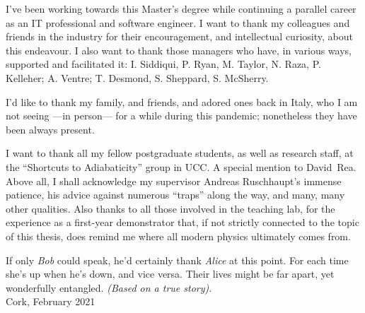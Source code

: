 I've been working towards this Master's degree
while continuing a parallel career
as an IT professional and software engineer.
I want to thank my
colleagues and friends in the industry for their encouragement,
and intellectual curiosity,
about this endeavour.
I also want to thank those managers
who have, in various ways, supported and facilitated it:
I. Siddiqui, P. Ryan, M. Taylor, N. Raza, P. Kelleher;
A. Ventre;
T. Desmond, S. Sheppard, S. McSherry.

I'd like to thank my family, and friends, and adored ones back in Italy,
who I am not seeing ---in person--- for a while during this pandemic;
nonetheless they have been always present.

I want to thank all my fellow postgraduate students,
as well as research staff,
at the ``Shortcuts to Adiabaticity'' group in UCC.
A special mention to David~Rea.
Above all, I shall acknowledge my supervisor Andreas Ruschhaupt's immense patience,
his advice against numerous ``traps'' along the way, and many, many other qualities.
Also thanks to all those involved in the teaching lab, for the experience as a
first-year demonstrator that,
if not strictly connected to the topic of this thesis,
does remind me where all modern physics ultimately comes from.

If only \emph{Bob} could speak, he'd certainly thank \emph{Alice} at this point.
For each time she's up when he's down, and vice versa.
Their lives might be far apart, yet wonderfully entangled.
\emph{(Based on a true story)}.
\\

\noindent{}Cork, February 2021
